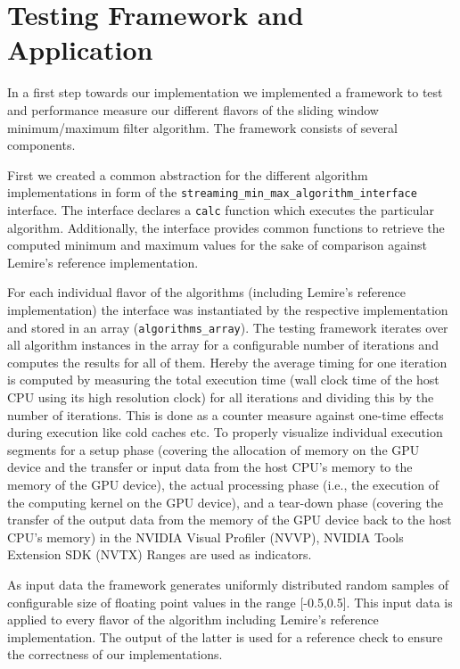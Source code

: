 \section{Testing Framework and Application}
In a first step towards our implementation we implemented a framework to test and performance measure our different flavors of the sliding window minimum/maximum filter algorithm. The framework consists of several components.

First we created a common abstraction for the different algorithm implementations in form of the \texttt{streaming\_min\_max\_algorithm\_interface} interface. The interface declares a \texttt{calc} function which executes the particular algorithm. Additionally, the interface provides common functions to retrieve the computed minimum and maximum values for the sake of comparison against Lemire's reference implementation.

For each individual flavor of the algorithms (including Lemire's reference implementation) the interface was instantiated by the respective implementation and stored in an array (\texttt{algorithms\_array}). The testing framework iterates over all algorithm instances in the array for a configurable number of iterations and computes the results for all of them. Hereby the average timing for one iteration is computed by measuring the total execution time (wall clock time of the host CPU using its high resolution clock) for all iterations and dividing this by the number of iterations. This is done as a counter measure against one-time effects during execution like cold caches etc. To properly visualize individual execution segments for a setup phase (covering the allocation of memory on the GPU device and the transfer or input data from the host CPU's memory to the memory of the GPU device), the actual processing phase (i.e., the execution of the computing kernel on the GPU device), and a tear-down phase (covering the transfer of the output data from the memory of the GPU device back to the host CPU's memory) in the NVIDIA Visual Profiler (NVVP), NVIDIA Tools Extension SDK (NVTX) Ranges are used as indicators.

As input data the framework generates uniformly distributed random samples of configurable size of floating point values in the range [-0.5,0.5]. This input data is applied to every flavor of the algorithm including Lemire's reference implementation. The output of the latter is used for a reference check to ensure the correctness of our implementations. 

